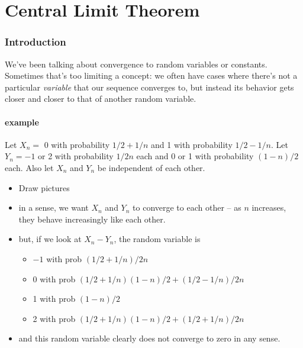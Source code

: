 

\part*{Central Limit Theorem}%

\section{Introduction}

    We've been talking about convergence to random variables or
    constants.  Sometimes that's too limiting a concept: we often have
    cases where there's not a particular \emph{variable} that our sequence
    converges to, but instead its behavior gets closer and closer to
    that of another random variable.  

\subsection{example}

     Let $X_n =$ 0 with probability $1/2 + 1/n$ and 1 with probability
     $1/2 - 1/n$.  Let $Y_n = - 1$ or 2 with probability $1/2n$ each and
     0 or 1 with probability $(1-n)/2$ each.  Also let $X_n$ and $Y_n$
     be independent of each other.
\begin{itemize}
\item Draw pictures
\item in a sense, we want $X_n$ and $Y_n$ to converge to each other --
       as $n$ increases, they behave increasingly like each other.
\item but, if we look at $X_n - Y_n$, the random variable is
\begin{itemize}
\item $-1$ with prob $(1/2 + 1/n)/2n$
\item 0 with prob $(1/2 + 1/n)(1 - n)/2 + (1/2-1/n)/2n$
\item 1 with prob $(1 - n)/2$
\item 2 with prob $(1/2 + 1/n)(1-n)/2 + (1/2+1/n)/2n$
\end{itemize}
\item and this random variable clearly does not converge to zero in any
       sense.
\end{itemize}

